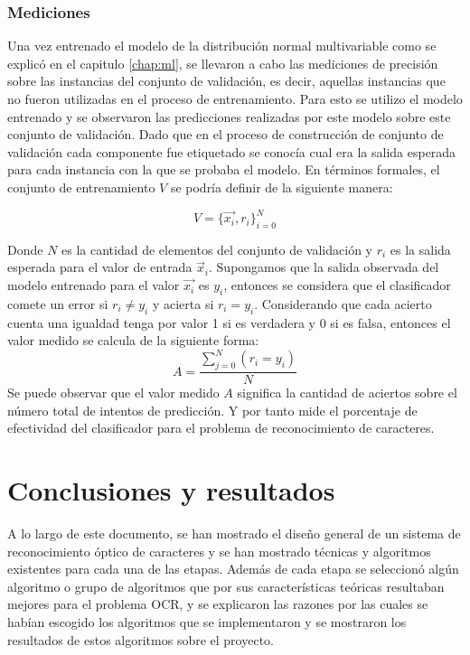 \documentclass[a4paper, 11pt, oneside]{report}
\begin{document}
\subsection{Mediciones}

Una vez entrenado el modelo de la distribución normal multivariable como se explicó en el capitulo \ref{chap:ml}, se llevaron a cabo las mediciones de precisión sobre las instancias del conjunto de validación, es decir, aquellas instancias que no fueron utilizadas en el proceso de entrenamiento. Para esto se utilizo el modelo entrenado y se observaron las predicciones realizadas por este modelo sobre este conjunto de validación. Dado que en el proceso de construcción de conjunto de validación cada componente fue etiquetado se conocía cual era la salida esperada para cada instancia con la que se probaba el modelo. En términos formales, el conjunto de entrenamiento $V$ se podría definir de la siguiente manera:

\[ V = \{\vec{x_i},r_i\}_{i=0}^N \]


Donde $N$ es la cantidad de elementos del conjunto de validación y $r_i$ es la salida esperada para el valor de entrada $\vec{x}_i$. Supongamos que la salida observada del modelo entrenado para el valor $\vec{x_i}$ es $y_i$, entonces se considera que el clasificador comete un error si $r_i \ne y_i$ y acierta si $r_i = y_i$. Considerando que cada acierto cuenta  una igualdad tenga por valor 1 si es verdadera y 0 si es falsa, entonces el valor medido se calcula de la siguiente forma:
\[ A = \frac{ \sum_{j=0}^{N}(r_i=y_i) }{N} \]
Se puede observar que el valor medido $A$ significa la cantidad de aciertos sobre el número total de intentos de predicción. Y por tanto mide el porcentaje de efectividad del clasificador para el problema de reconocimiento de caracteres.

\chapter{Conclusiones y resultados}
\label{chap:results}
A lo largo de este documento, se han mostrado el diseño general de un sistema de reconocimiento óptico de caracteres y se han mostrado técnicas y algoritmos existentes para cada una de las etapas. Además de cada etapa se seleccionó algún algoritmo o grupo de algoritmos que por sus características teóricas resultaban mejores para el problema OCR, y se explicaron las razones por las cuales se habían escogido los algoritmos que se implementaron y se mostraron los resultados de estos algoritmos sobre el proyecto.
\end{document}
